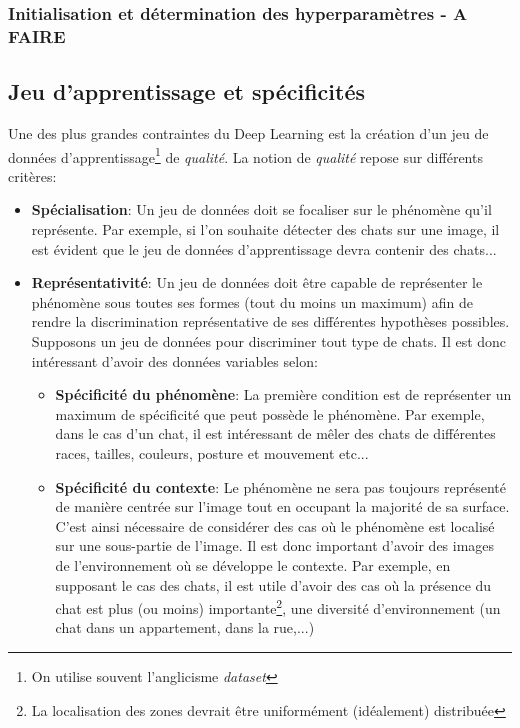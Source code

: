 \subsubsection{Initialisation et détermination des hyperparamètres - A FAIRE}

\subsection{Jeu d'apprentissage et spécificités}
Une des plus grandes contraintes du Deep Learning est la création d'un jeu de données d'apprentissage\footnote{On utilise souvent l'anglicisme \textit{dataset}} de \textit{qualité}. La notion de \textit{qualité} repose sur différents critères:
\begin{itemize}
    \item \textbf{Spécialisation}: Un jeu de données doit se focaliser sur le phénomène qu'il représente. Par exemple, si l'on souhaite détecter des chats sur une image, il est évident que le jeu de données d'apprentissage devra contenir des chats...
    \item \textbf{Représentativité}: Un jeu de données doit être capable de représenter le phénomène sous toutes ses formes (tout du moins un maximum) afin de rendre la discrimination représentative de ses différentes hypothèses possibles. Supposons un jeu de données pour discriminer tout type de chats. Il est donc intéressant d'avoir des données variables selon:
    \begin{itemize}
        \item \textbf{Spécificité du phénomène}: La première condition est de représenter un maximum de spécificité que peut possède le phénomène. Par exemple, dans le cas d'un chat, il est intéressant de mêler des chats de différentes races, tailles, couleurs, posture et mouvement etc...
        \item \textbf{Spécificité du contexte}: Le phénomène ne sera pas toujours représenté de manière centrée sur l'image tout en occupant la majorité de sa surface. C'est ainsi nécessaire de considérer des cas où le phénomène est localisé sur une sous-partie de l'image. Il est donc important d'avoir des images de l'environnement où se développe le contexte. Par exemple, en supposant le cas des chats, il est utile d'avoir des cas où la présence du chat est plus (ou moins) importante\footnote{La localisation des zones devrait être uniformément (idéalement) distribuée}, une diversité d'environnement (un chat dans un appartement, dans la rue,...)

\end{itemize}
\end{itemize}

